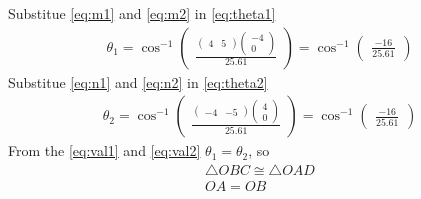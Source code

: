 \documentclass[10pt,a4paper]{article}
\newcommand{\myvec}[1]{\ensuremath{\begin{pmatrix}#1\end{pmatrix}}}
\begin{document}
Substitue \eqref{eq:m1} and \eqref{eq:m2} in \eqref{eq:theta1}
\begin{align}
    \theta_1 =\cos^{-1}\myvec{\frac{\myvec{4&5}\myvec{-4\\0}}{25.61}}=\cos^{-1}\myvec{\frac{-16}{25.61}}
    \label{eq:val1}
\end{align}
Substitue \eqref{eq:n1} and \eqref{eq:n2} in \eqref{eq:theta2}
\begin{align}
    \theta_2 =\cos^{-1}\myvec{\frac{\myvec{-4&-5}\myvec{4\\0}}{25.61}}=\cos^{-1}\myvec{\frac{-16}{25.61}}
    \label{eq:val2}
\end{align}
From the \eqref{eq:val1} and \eqref{eq:val2} $\theta_1=\theta_2$, so
\begin{align}
    \triangle{OBC} \cong \triangle{OAD}\\
    OA = OB
\end{align}
\end{document}
